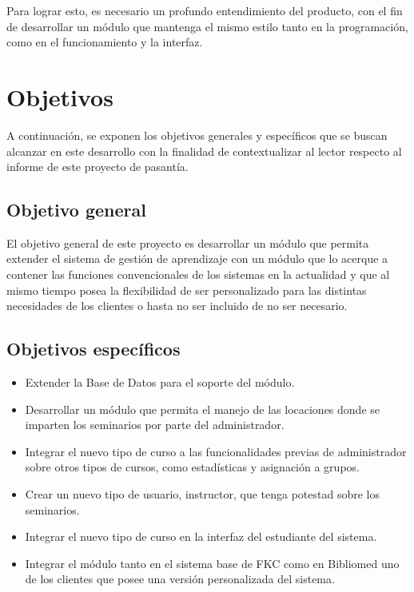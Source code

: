 Para lograr esto, es necesario un profundo entendimiento del producto, con el fin de desarrollar un módulo que mantenga el mismo estilo tanto en la programación, como en el funcionamiento y la interfaz. 


\section*{Objetivos}
A continuación, se exponen los objetivos generales y específicos que se buscan alcanzar en este desarrollo con la finalidad de contextualizar al lector respecto al informe de este proyecto de pasantía.

\subsection*{Objetivo general}
El objetivo general de este proyecto es desarrollar un módulo que permita extender el sistema de gestión de aprendizaje con un módulo que lo acerque a contener las funciones convencionales de los sistemas en la actualidad y que al mismo tiempo posea la flexibilidad de ser personalizado para las distintas necesidades de los clientes o hasta no ser incluido de no ser necesario.

\subsection*{Objetivos específicos}

\begin{itemize}
	\item Extender la Base de Datos para el soporte del módulo.
	\item Desarrollar un módulo que permita el manejo de las locaciones donde se imparten los seminarios por parte del administrador.
	\item Integrar el nuevo tipo de curso a las funcionalidades previas de administrador sobre otros tipos de cursos, como estadísticas y asignación a grupos.
	\item Crear un nuevo tipo de usuario, instructor, que tenga potestad sobre los seminarios.
	\item Integrar el nuevo tipo de curso en la interfaz del estudiante del sistema.
	\item Integrar el módulo tanto en el sistema base de FKC como en Bibliomed uno de los clientes que posee una versión personalizada del sistema.
\end{itemize}








